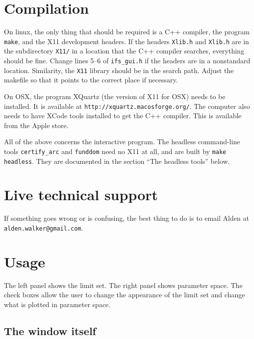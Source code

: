 \documentclass{amsart}
\begin{document}
\section{Compilation}

On linux, the only thing that should be required is a C++ compiler, the 
program \texttt{make}, and the X11 development headers.  
If the headers \texttt{Xlib.h} and \texttt{Xlib.h} are in 
the subdirectory \texttt{X11/} in a location that the C++ compiler 
searches, everything should be fine.  Change lines 5--6 of \verb|ifs_gui.h|
if the headers are in a nonstandard location.  Similarity, the \texttt{X11}
library should be in the search path.  Adjust the makefile so that it 
points to the correct place if necessary.

On OSX, the program XQuartz (the version of X11 for OSX) needs to be installed.
It is available at \texttt{http://xquartz.macosforge.org/}.
The computer also needs to have XCode tools installed to get the
C++ compiler.  This is available from the Apple store.

All of the above concerns the interactive program.  The headless command-line
tools \texttt{certify\_arc} and \texttt{funddom} need no X11 at all, and are
built by \texttt{make headless}.  They are documented in the section
``The headless tools'' below.

\section{Live technical support}

If something goes wrong or is confusing, the best thing to 
do is to email Alden at \texttt{alden.walker@gmail.com}.

\section{Usage}

The left panel shows the limit set.  The right panel shows parameter space.
The check boxes allow the user to change the appearance of the limit set
and change what is plotted in parameter space.

\subsection{The window itself}
\end{document}

